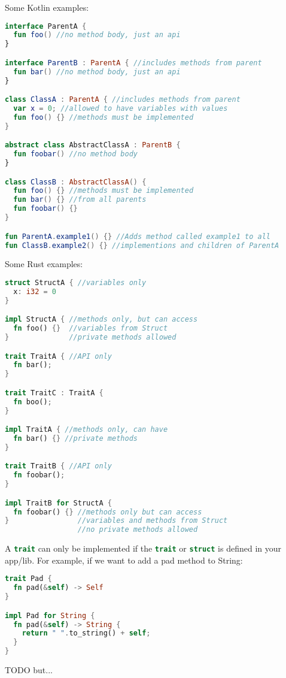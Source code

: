 \documentclass[a4paper,11pt]{article}
\begin{document}
\newpage
Some Kotlin examples:
\begin{lstlisting}[language=Kotlin,frame=single]
interface ParentA {
  fun foo() //no method body, just an api
}

interface ParentB : ParentA { //includes methods from parent
  fun bar() //no method body, just an api
}

class ClassA : ParentA { //includes methods from parent
  var x = 0; //allowed to have variables with values
  fun foo() {} //methods must be implemented
}

abstract class AbstractClassA : ParentB {
  fun foobar() //no method body
}

class ClassB : AbstractClassA() {
  fun foo() {} //methods must be implemented
  fun bar() {} //from all parents
  fun foobar() {}
}

fun ParentA.example1() {} //Adds method called example1 to all
fun ClassB.example2() {} //implementions and children of ParentA
\end{lstlisting}

Some Rust examples:
\begin{lstlisting}[language=Rust,frame=single]
struct StructA { //variables only
  x: i32 = 0 
}

impl StructA { //methods only, but can access
  fn foo() {}  //variables from Struct 
}              //private methods allowed

trait TraitA { //API only
  fn bar();
}

trait TraitC : TraitA {
  fn boo();
}

impl TraitA { //methods only, can have 
  fn bar() {} //private methods
}

trait TraitB { //API only
  fn foobar();
}

impl TraitB for StructA {
  fn foobar() {} //methods only but can access
}                //variables and methods from Struct
                 //no private methods allowed
\end{lstlisting}

A \lstinline[language=Rust]{trait} can only be implemented if the \lstinline[language=Rust]{trait} or \lstinline[language=Rust]{struct} is defined in your app/lib. For example, if we want to add a pad method to String:

\begin{lstlisting}[language=Rust,frame=single]
trait Pad {
  fn pad(&self) -> Self
}

impl Pad for String {
  fn pad(&self) -> String {
    return " ".to_string() + self;
  }
}
\end{lstlisting}
TODO
but...
\end{document}
